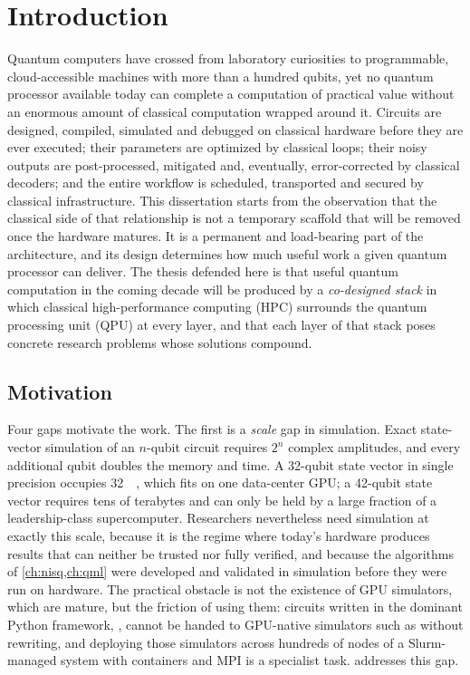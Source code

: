 \chapter{Introduction}\label{ch:intro}

Quantum computers have crossed from laboratory curiosities to programmable, cloud-accessible machines with more than a hundred qubits, yet no quantum processor available today can complete a computation of practical value without an enormous amount of classical computation wrapped around it. Circuits are designed, compiled, simulated and debugged on classical hardware before they are ever executed; their parameters are optimized by classical loops; their noisy outputs are post-processed, mitigated and, eventually, error-corrected by classical decoders; and the entire workflow is scheduled, transported and secured by classical infrastructure. This dissertation starts from the observation that the classical side of that relationship is not a temporary scaffold that will be removed once the hardware matures. It is a permanent and load-bearing part of the architecture, and its design determines how much useful work a given quantum processor can deliver. The thesis defended here is that useful quantum computation in the coming decade will be produced by a \emph{co-designed stack} in which classical high-performance computing (HPC) surrounds the quantum processing unit (QPU) at every layer, and that each layer of that stack poses concrete research problems whose solutions compound.

\section{Motivation}\label{sec:intro:motivation}

Four gaps motivate the work. The first is a \emph{scale} gap in simulation. Exact state-vector simulation of an $n$-qubit circuit requires $2^{n}$ complex amplitudes, and every additional qubit doubles the memory and time. A 32-qubit state vector in single precision occupies \SI{32}{\gibi\byte}, which fits on one data-center GPU; a 42-qubit state vector requires tens of terabytes and can only be held by a large fraction of a leadership-class supercomputer. Researchers nevertheless need simulation at exactly this scale, because it is the regime where today's hardware produces results that can neither be trusted nor fully verified, and because the algorithms of \cref{ch:nisq,ch:qml} were developed and validated in simulation before they were run on hardware. The practical obstacle is not the existence of GPU simulators, which are mature, but the friction of using them: circuits written in the dominant Python framework, \qiskit, cannot be handed to GPU-native simulators such as \cudaq{} without rewriting, and deploying those simulators across hundreds of nodes of a Slurm-managed system with containers and MPI is a specialist task.  addresses this gap.

